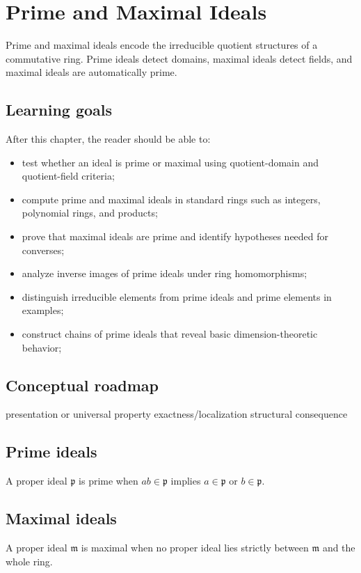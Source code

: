 \chapter{Prime and Maximal Ideals}
\label{ch:v02}

Prime and maximal ideals encode the irreducible quotient structures of a commutative ring. Prime ideals detect domains, maximal ideals detect fields, and maximal ideals are automatically prime.

\section*{Learning goals}
After this chapter, the reader should be able to:
\begin{itemize}
\item test whether an ideal is prime or maximal using quotient-domain and quotient-field criteria;
\item compute prime and maximal ideals in standard rings such as integers, polynomial rings, and products;
\item prove that maximal ideals are prime and identify hypotheses needed for converses;
\item analyze inverse images of prime ideals under ring homomorphisms;
\item distinguish irreducible elements from prime ideals and prime elements in examples;
\item construct chains of prime ideals that reveal basic dimension-theoretic behavior;
\end{itemize}
\section*{Conceptual roadmap}
\volroadmap
  {presentation or universal property}
  {exactness/localization}
  {structural consequence}

\section{Prime ideals}
A proper ideal $\mathfrak p$ is prime when $ab\in\mathfrak p$ implies $a\in\mathfrak p$ or $b\in\mathfrak p$.

\section{Maximal ideals}
A proper ideal $\mathfrak m$ is maximal when no proper ideal lies strictly between $\mathfrak m$ and the whole ring.

